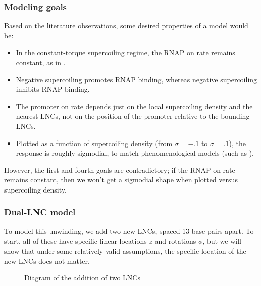 \documentclass[11pt]{article}
\begin{document}
\subsubsection{Modeling goals}
Based on the literature observations, some desired properties of a model would be:
\begin{itemize}
    \item In the constant-torque supercoiling regime, the RNAP on rate remains constant, as in \textcite{revyakinPromoterUnwindingPromoter2004}.
    \item Negative supercoiling promotes RNAP binding, whereas negative supercoiling inhibits RNAP binding.
    \item The promoter on rate depends just on the local supercoiling density and the nearest LNCs, not on the position of the promoter relative to the bounding LNCs.
    \item Plotted as a function of supercoiling density (from \(\sigma = -.1\) to \(\sigma = .1\)), the response is roughly sigmodial, to match phenomenological models (such as \textcite{elhoudaiguiBacterialGenomeArchitecture2019a}).
\end{itemize}

However, the first and fourth goals are contradictory; if the RNAP on-rate remains constant, then we won't get a sigmodial shape when plotted versus supercoiling density. 

\FloatBarrier
\subsubsection{Dual-LNC model}
To model this unwinding, we add two new LNCs, spaced 13 base pairs apart. To start, all of these have specific linear locations \(z\) and rotations \(\phi\), but we will show that under some relatively valid assumptions, the specific location of the new LNCs does not matter.

\begin{figure}[h]
    \centering
    \caption{Diagram of the addition of two LNCs}
    \label{fig:lnc_diagram}
\end{figure}
\end{document}
